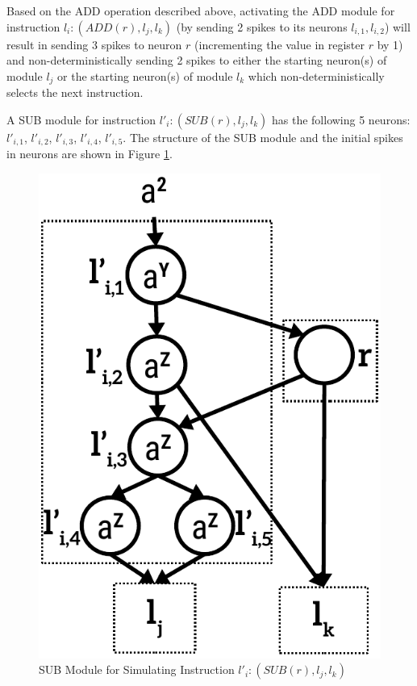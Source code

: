 \documentclass[runningheads,a4paper]{llncs}
\begin{document}
Based on the ADD operation described above, activating the ADD module for instruction $l_i:(ADD(r),l_j,l_k)$ (by sending 2 spikes to its neurons 
$l_{i,1}, l_{i,2}$) will result in sending $3$ spikes to neuron $r$ (incrementing the value in register $r$ by 1) and non-deterministically sending 2
spikes to either the starting neuron(s) of module $l_{j}$ or the starting neuron(s) of module $l_k$ which non-deterministically selects the next 
instruction. 


A SUB module for instruction $l'_i:(SUB(r), l_j, l_k)$ has the following 5 neurons: $l'_{i,1}$, $l'_{i,2}$, $l'_{i,3}$, $l'_{i,4}$, $l'_{i,5}$.
The structure of the SUB module and the initial spikes in neurons are shown in Figure \ref{fig-sub}. 

\begin{figure}
\begin{center}
\includegraphics[scale=0.50]{figures/sub-module-2.pdf}
\caption{SUB Module for Simulating Instruction $l'_i:(SUB(r), l_j, l_k)$}
\label{fig-sub}
\end{center}
\end{figure}   
\end{document}
